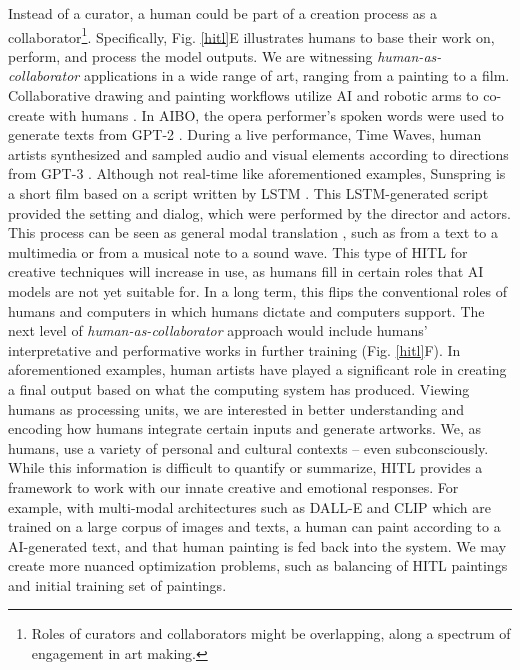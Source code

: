 \documentclass[letterpaper]{article} %
\begin{document}
Instead of a curator, a human could be part of a creation process as a collaborator\footnote{Roles of curators and collaborators might be overlapping, along a spectrum of engagement in art making.}. Specifically, Fig. \ref{hitl}E illustrates humans to base their work on, perform, and process the model outputs. We are witnessing \emph{human-as-collaborator} applications in a wide range of art, ranging from a painting to a film. Collaborative drawing and painting workflows utilize AI and robotic arms to co-create with humans \cite{Jansen2021}. In AIBO, the opera performer's spoken words were used to generate texts from GPT-2 \cite{Pearlman2021}. During a live performance, Time Waves, human artists synthesized and sampled audio and visual elements according to directions from GPT-3 \cite{TimeWaves}. Although not real-time like aforementioned examples, Sunspring \cite{Sunspring} is a short film based on a script written by LSTM \cite{Hochreiter1997}. This LSTM-generated script provided the setting and dialog, which were performed by the director and actors. This process can be seen as general modal translation \cite{Specia2016}, such as from a text to a multimedia or from a musical note to a sound wave. This type of HITL for creative techniques will increase in use, as humans fill in certain roles that AI models are not yet suitable for. In a long term, this flips the conventional roles of humans and computers in which humans dictate and computers support.  The next level of \emph{human-as-collaborator} approach would include humans' interpretative and performative works in further training (Fig. \ref{hitl}F). In aforementioned examples, human artists have played a significant role in creating a final output based on what the computing system has produced. Viewing humans as processing units, we are interested in better understanding and encoding how humans integrate certain inputs and generate artworks. We, as humans, use a variety of personal and cultural contexts -- even subconsciously. While this information is difficult to quantify or summarize, HITL provides a framework to work with our innate creative and emotional responses. For example, with multi-modal architectures such as DALL-E \cite{Ramesh2021} and CLIP \cite{Radford2021} which are trained on a large corpus of images and texts, a human can paint according to a AI-generated text, and that human painting is fed back into the system. We may create more nuanced optimization problems, such as balancing of HITL paintings and initial training set of paintings.
\end{document}
